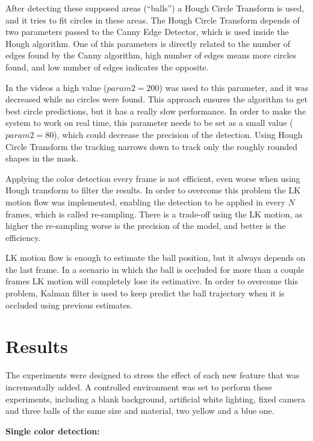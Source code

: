 \documentclass[10pt,twocolumn,letterpaper]{article}
\begin{document}
After detecting these supposed areas (``balls'') a Hough Circle Transform  is used, and it tries to fit circles in these areas. The Hough Circle Transform depends of two parameters passed to the Canny Edge Detector, which is used inside the Hough algorithm.  One of this parameters is directly related to the number of edges found by the Canny algorithm, high number of edges means more circles found, and low number of edges indicates the opposite.

In the videos a high value ($param2 = 200$) was used to this parameter, and it was decreased while no circles were found. This approach ensures the algorithm to get best circle predictions, but it has a really slow performance. In order to make the system to work on real time, this parameter needs to be set as a small value ($param2 = 80$), which could decrease the precision of the detection. Using Hough Circle Transform the tracking narrows down to track only the roughly rounded shapes in the mask.

Applying the color detection every frame is not efficient, even worse when using Hough transform to filter the results. In order to overcome this problem the LK motion flow was implemented, enabling the detection to be applied  in every $N$ frames, which is called re-sampling. There is a trade-off using the LK motion, as higher the re-sampling worse is the precision of the model, and better is the efficiency.

LK motion flow is enough to estimate the ball position, but it always depends on the last frame. In a scenario in which the ball is occluded for more than a couple frames  LK motion will completely lose its estimative. In order to overcome this problem, Kalman filter is used to keep predict the ball trajectory when it is occluded using previous estimates.

\section{Results}\label{sec:result}

The experiments were designed to stress the effect of each new feature that was incrementally added. A controlled environment was set to perform these
experiments, including a blank background, artificial white lighting, fixed
camera and three balls of the same size and material, two yellow and a blue
one.

\bigbreak{}
\textbf{Single color detection:}
\bigbreak{}
\end{document}
